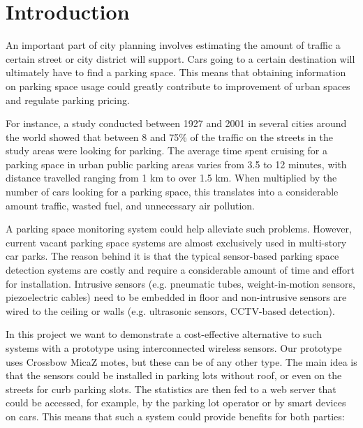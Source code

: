 ﻿\chapter{Introduction}
\label{chap:introduction}
\noindent An important part of city planning involves estimating the amount of traffic a certain street or city district will support.
Cars going to a certain destination will ultimately have to find a parking space. 
This means that obtaining information on parking space usage could greatly contribute to improvement of urban spaces and regulate parking pricing.

For instance, a study conducted between 1927 and 2001 \cite{cruising_for_parking_2007} in several cities around the world showed 
that between 8 and 75\% of the traffic on the streets in the study areas were looking for parking.
The average time spent cruising for a parking space in urban public parking areas varies from 3.5 to 12 minutes, 
with distance travelled ranging from 1 km to over 1.5 km. 
When multiplied by the number of cars looking for a parking space, this translates into a considerable amount traffic, wasted fuel, and unnecessary air pollution.

A parking space monitoring system could help alleviate such problems. However, current vacant parking space systems are almost exclusively used in multi-story car parks.
The reason behind it is that the typical sensor-based parking space detection systems are costly and require a considerable amount of time and effort for installation.
Intrusive sensors (e.g. pneumatic tubes, weight-in-motion sensors, piezoelectric cables) need to be embedded in floor and non-intrusive sensors are wired to 
the ceiling or walls (e.g. ultrasonic sensors, CCTV-based detection).

In this project we want to demonstrate a cost-effective alternative to such systems with a prototype using interconnected wireless sensors.
Our prototype uses Crossbow MicaZ motes, but these can be of any other type.
The main idea is that the sensors could be installed in parking lots without roof, or even on the streets for curb parking slots.
The statistics are then fed to a web server that could be accessed, for example, by the parking lot operator or by smart devices on cars.
This means that such a system could provide benefits for both parties:

